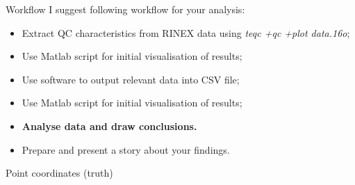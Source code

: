 \documentclass[11pt]{beamer}
\begin{document}
	\begin{frame}{Workflow}
		I suggest following workflow for your analysis:
		
		\begin{itemize}
			\item Extract QC characteristics from RINEX data using \textit{ teqc +qc +plot data.16o};
			\item Use Matlab script for initial visualisation of results;
			\item Use software to output relevant data into CSV file;
			\item Use Matlab script for initial visualisation of results;
			\item \textbf{Analyse data and draw conclusions.}
			\item \alert{Prepare and present a story about your findings.}
		\end{itemize}

	\end{frame}

{ 

\begin{frame}{Point coordinates (truth)}
	\begin{table}
		\centering
		\begin{minipage}[t]{\textwidth}%
			\caption{OSGB coordinates for the Project 1}
		\end{minipage}
	\end{table}
	
\end{frame}
} %
\end{document}
